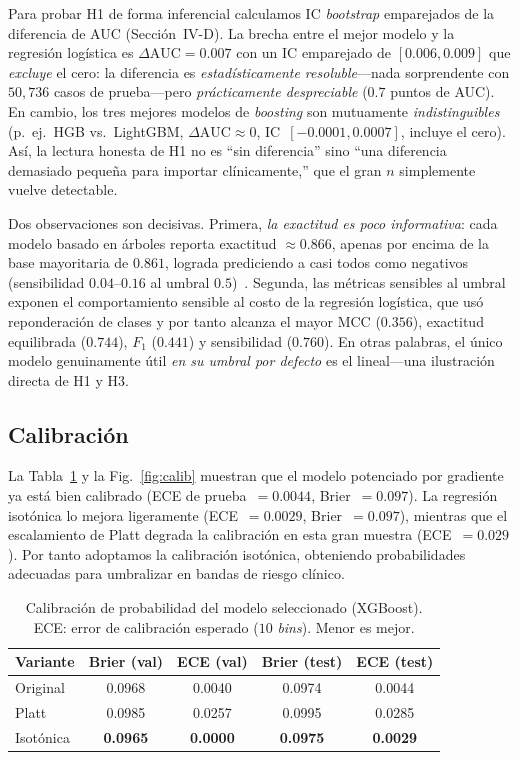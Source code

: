 \documentclass[conference]{IEEEtran}
\begin{document}
Para probar H1 de forma inferencial calculamos IC \emph{bootstrap} emparejados de la
diferencia de AUC (Sección~IV-D). La brecha entre el mejor modelo y la regresión logística
es $\Delta\text{AUC}=0.007$ con un IC emparejado de $[0.006,0.009]$ que \emph{excluye} el
cero: la diferencia es \emph{estadísticamente resoluble}---nada sorprendente con $50{,}736$
casos de prueba---pero \emph{prácticamente despreciable} ($0.7$ puntos de AUC). En cambio,
los tres mejores modelos de \emph{boosting} son mutuamente \emph{indistinguibles} (p.\ ej.\
HGB vs.\ LightGBM, $\Delta\text{AUC}\approx0$, IC~$[-0.0001,0.0007]$, incluye el cero). Así,
la lectura honesta de H1 no es ``sin diferencia'' sino ``una diferencia demasiado pequeña
para importar clínicamente,'' que el gran $n$ simplemente vuelve detectable.

Dos observaciones son decisivas. Primera, \emph{la exactitud es poco informativa}: cada
modelo basado en árboles reporta exactitud $\approx0.866$, apenas por encima de la base
mayoritaria de $0.861$, lograda prediciendo a casi todos como negativos (sensibilidad
$0.04$--$0.16$ al umbral $0.5$)~\cite{saito2015precision,he2009learning}. Segunda, las
métricas sensibles al umbral exponen el comportamiento sensible al costo de la regresión
logística, que usó reponderación de clases y por tanto alcanza el mayor MCC ($0.356$),
exactitud equilibrada ($0.744$), $F_1$ ($0.441$) y sensibilidad ($0.760$). En otras
palabras, el único modelo genuinamente útil \emph{en su umbral por defecto} es el
lineal---una ilustración directa de H1 y H3.

\subsection{Calibración}
La Tabla~\ref{tab:calib} y la Fig.~\ref{fig:calib} muestran que el modelo potenciado por
gradiente ya está bien calibrado (ECE de prueba~$=0.0044$, Brier~$=0.097$). La regresión
isotónica lo mejora ligeramente (ECE~$=0.0029$, Brier~$=0.097$), mientras que el
escalamiento de Platt degrada la calibración en esta gran muestra (ECE~$=0.029$). Por tanto
adoptamos la calibración isotónica, obteniendo probabilidades adecuadas para umbralizar en
bandas de riesgo clínico.

\begin{table}[t]
\caption{Calibración de probabilidad del modelo seleccionado (XGBoost). ECE: error de
calibración esperado ($10$ \emph{bins}). Menor es mejor.}
\label{tab:calib}
\centering
\begin{tabular}{lcccc}
\toprule
Variante & Brier (val) & ECE (val) & Brier (test) & ECE (test) \\
\midrule
Original  & 0.0968 & 0.0040 & 0.0974 & 0.0044 \\
Platt     & 0.0985 & 0.0257 & 0.0995 & 0.0285 \\
Isotónica & \textbf{0.0965} & \textbf{0.0000} & \textbf{0.0975} & \textbf{0.0029} \\
\bottomrule
\end{tabular}
\end{table}
\end{document}
